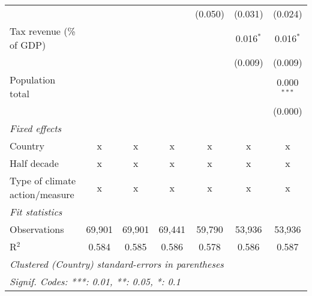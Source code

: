 \begin{tabular}{lcccccc}
                                              &             &                &                & (0.050)        & (0.031)        & (0.024)\\   
   Tax revenue (\% of GDP)                    &             &                &                &                & 0.016$^{*}$    & 0.016$^{*}$\\   
                                              &             &                &                &                & (0.009)        & (0.009)\\   
   Population total                           &             &                &                &                &                & 0.000$^{***}$\\   
                                              &             &                &                &                &                & (0.000)\\   
   \emph{Fixed effects}\\
   Country                                    & x           & x              & x              & x              & x              & x\\  
   Half decade                                & x           & x              & x              & x              & x              & x\\  
   Type of climate action/measure             & x           & x              & x              & x              & x              & x\\  
   \midrule \emph{Fit statistics}\\
   Observations                               & 69,901      & 69,901         & 69,441         & 59,790         & 53,936         & 53,936\\  
   R$^2$                                      & 0.584       & 0.585          & 0.586          & 0.578          & 0.586          & 0.587\\  
   \midrule
   \multicolumn{7}{l}{\emph{Clustered (Country) standard-errors in parentheses}}\\
   \multicolumn{7}{l}{\emph{Signif. Codes: ***: 0.01, **: 0.05, *: 0.1}}\\
\end{tabular}
\par\endgroup


